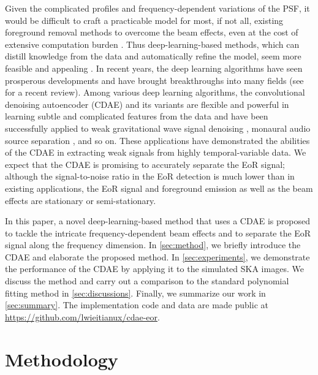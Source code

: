 \documentclass[letters,fleqn,usenatbib,onecolumn]{mnras}
\begin{document}
Given the complicated profiles and frequency-dependent variations of
the PSF, it would be difficult to craft a practicable model for most,
if not all, existing foreground removal methods to overcome the beam
effects, even at the cost of extensive computation burden
\citep[e.g.,][]{lochner2015,vafaeiSadr2018}.
{\color{cyan}%
Thus deep-learning-based methods, which can distill knowledge from the
data and automatically refine the model, seem more feasible and
appealing \citep[e.g.,][]{herbel2018,vafaeiSadr2018}.}
In recent years, the deep learning algorithms have seen prosperous
developments and have brought breakthroughs into many fields
(see \citealt{lecun2015} for a recent review).
Among various deep learning algorithms, the convolutional denoising
autoencoder (CDAE) and its variants are flexible and powerful in
learning subtle and complicated features from the data and have been
successfully applied to
weak gravitational wave signal denoising \citep[e.g.,][]{shen2017},
monaural audio source separation \citep[e.g.,][]{grais2017}, and so on.
{\color{cyan}%
These applications have demonstrated the abilities of the CDAE in
extracting weak signals from highly temporal-variable data.
We expect that the CDAE is promising to accurately separate
the EoR signal;
although the signal-to-noise ratio in the EoR detection is much lower
than in existing applications, the EoR signal and foreground emission
as well as the beam effects are stationary or semi-stationary.} %

In this paper, a novel deep-learning-based method that uses a CDAE
is proposed to tackle the intricate frequency-dependent beam effects
and to separate the EoR signal along the frequency dimension.
In \autoref{sec:method}, we briefly introduce the CDAE and elaborate
the proposed method.
In \autoref{sec:experiments}, we demonstrate the performance of the
CDAE by applying it to the simulated SKA images.
We discuss the method and carry out a comparison to the standard
polynomial fitting method in \autoref{sec:discussions}.
Finally, we summarize our work in \autoref{sec:summary}.
The implementation code and data are made public at
\url{https://github.com/lwieitianux/cdae-eor}.


\section{Methodology}
\label{sec:method}

\end{document}

